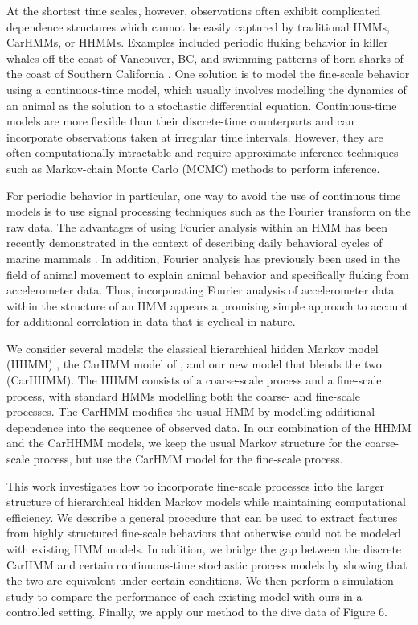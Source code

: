 At the shortest time scales, however, observations often exhibit complicated dependence structures which cannot be easily captured by traditional HMMs, CarHMMs, or HHMMs. Examples included periodic fluking behavior in killer whales off the coast of Vancouver, BC, and swimming patterns of horn sharks of the coast of Southern California \citep{Adam:2019}. One solution is to model the fine-scale behavior using a continuous-time model, which usually involves modelling the dynamics of an animal as the solution to a stochastic differential equation. Continuous-time models are more flexible than their discrete-time counterparts and can incorporate observations taken at irregular time intervals. However, they are often computationally intractable and require approximate inference techniques such as Markov-chain Monte Carlo (MCMC) methods to perform inference.

For periodic behavior in particular, one way to avoid the use of continuous time models is to use signal processing techniques such as the Fourier transform on the raw data. 
The advantages of using Fourier analysis within an HMM has been recently demonstrated in the context of describing daily behavioral cycles of marine mammals \citep{Heerah:2017}.
 In addition, Fourier analysis has previously been used in the field of animal movement to explain animal behavior \citep{Fehlmann:2017} and specifically fluking \citep{Shorter:2017} from accelerometer data. 
 Thus, incorporating Fourier analysis of accelerometer data within the structure of an HMM appears a promising simple approach to account for additional correlation in data that is cyclical in nature.

We consider several models: the classical hierarchical hidden Markov model (HHMM) \citep{Barajas:2017}, the CarHMM model of \citep{Lawler:2019}, and our new model that blends the two (CarHHMM). 
The HHMM consists of a coarse-scale process and a fine-scale process, with standard HMMs modelling both the coarse- and fine-scale processes. 
The CarHMM modifies the usual HMM by modelling additional dependence into the sequence of observed data. 
In our combination of the HHMM and the CarHHMM models, we keep the usual Markov structure for the coarse-scale process, but use the CarHMM model for the fine-scale process.

This work investigates how to incorporate fine-scale processes into the larger structure of hierarchical hidden Markov models while maintaining computational efficiency. 
We describe a general procedure that can be used to extract features from highly structured fine-scale behaviors that otherwise could not be modeled with existing HMM models. 
In addition, we bridge the gap between the discrete CarHMM and certain continuous-time stochastic process models by showing that the two are equivalent under certain conditions. 
We then perform a simulation study to compare the performance of each existing model with ours in a controlled setting. 
Finally, we apply our method to the dive data of Figure 6.





